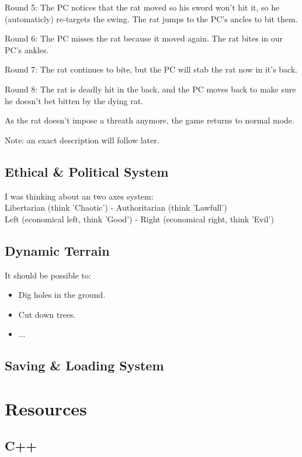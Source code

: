 \documentclass[a4paper]{report}
\begin{document}
			Round 5:
			The PC notices that the rat moved so his sword won't hit it, so  he (automaticly) re-targets the swing. The rat jumps to the PC's ancles to bit them.

			Round 6:
			The PC misses the rat because it moved again. The rat bites in our PC's ankles. 

			Round 7:
			The rat continues to bite, but the PC will stab the rat now in it's back.

			Round 8:
			The rat is deadly hit in the back, and the PC moves back to make sure he doesn't bet bitten by the dying rat.

			As the rat doesn't impose a threath anymore, the game returns to normal mode.

		Note: an exact description will follow later.

	\chapter{Ethical \& Political System}

		I was thinking about an two axes system: \\
		Libertarian (think 'Chaotic') - Authoritarian (think 'Lawfull') \\
		Left (economical left, think 'Good') - Right (economical right, think 'Evil')

	\chapter{Dynamic Terrain}

		It should be possible to:
		\begin{itemize}
			\item Dig holes in the ground.
			\item Cut down trees.
			\item ...
		\end{itemize}

	\chapter{Saving \& Loading System}

\part{Resources}

	\chapter{C++}
\end{document}
